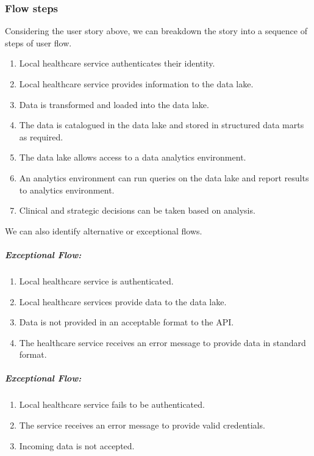 \documentclass[10pt]{article}
\begin{document}
\subsubsection{Flow steps}\label{flow-steps}

Considering the user story above, we can breakdown the story into a
sequence of steps of user flow.

\begin{enumerate}
\def\labelenumi{\arabic{enumi}.}
\itemsep1pt\parskip0pt
\item
Local healthcare service authenticates their identity.
\item	
	Local healthcare service provides information to the data lake.
\item
  Data is transformed and loaded into the data lake.
\item
  The data is catalogued in the data lake and stored in structured data
  marts as required.
\item
  The data lake allows access to a data analytics environment.
\item
  An analytics environment can run queries on the data lake and report
  results to analytics environment.
\item
  Clinical and strategic decisions can be taken based on analysis.
\end{enumerate}

We can also identify alternative or exceptional flows. 
\subparagraph{Exceptional Flow:}

\begin{enumerate}
\def\labelenumi{\arabic{enumi}.}
\itemsep1pt\parskip0pt
\item	
Local healthcare service is authenticated.
\item
  Local healthcare services provide data to the data lake.
\item
  Data is not provided in an acceptable format to the API.
\item
  The healthcare service receives an error message to provide data in
  standard format.
\end{enumerate}

\subparagraph{Exceptional Flow:} 	
\begin{enumerate}	
	\def\labelenumi{\arabic{enumi}.}	
	\itemsep1pt\parskip0pt	
	\item Local healthcare service fails to be	
	authenticated.	
	\item The service receives an error message to provide valid	
	credentials.	
	\item Incoming data is not accepted.	
\end{enumerate}
\end{document}
